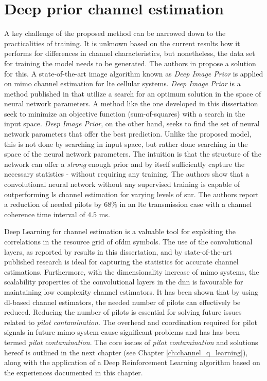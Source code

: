 \section{Deep prior channel estimation}\label{sec:research_trends_channel_estimation}
A key challenge of the proposed method can be narrowed down to the practicalities of training. It is unknown based on the current results how it performs for differences in channel characteristics, but nonetheless, the data set for training the model needs to be generated. The authors in \cite{Balevi2019} propose a solution for this. A state-of-the-art image algorithm known as \emph{Deep Image Prior} is applied on \gls{mimo} channel estimation for \gls{lte} cellular systems. \emph{Deep Image Prior} is a method published in \cite{DeepPrior} that utilize a search for an optimum solution in the space of neural network parameters. A method like the one developed in this dissertation seek to minimize an objective function (sum-of-squares) with a search in the input space. \emph{Deep Image Prior}, on the other hand, seeks to find the set of neural network parameters that offer the best prediction. Unlike the proposed model, this is not done by searching in input space, but rather done searching in the space of the neural network parameters. The intuition is that the structure of the network can offer a \emph{strong} enough prior and by itself sufficiently capture the necessary statistics  - without requiring any training. The authors show that a convolutional neural network without any supervised training is capable of outperforming \gls{ls} channel estimation for varying levels of \gls{snr}. The authors report a reduction of needed pilots by $68\%$ in an \gls{lte} transmission case with a channel coherence time interval of $4.5$ ms.

Deep Learning for channel estimation is a valuable tool for exploiting the correlations in the resource grid of \gls{ofdm} symbols. The use of the convolutional layers, as reported by results in this dissertation, and by state-of-the-art published research is ideal for capturing the statistics for accurate channel estimations. Furthermore, with the dimensionality increase of \gls{mimo} systems, the scalability properties of the convolutional layers in the \gls{dnn} is favourable for maintaining low complexity channel estimators. It has been shown that by using \gls{dl}-based channel estimators, the needed number of pilots can effectively be reduced. Reducing the number of pilots is essential for solving future issues related to \emph{pilot contamination}. The overhead and coordination required for pilot signals in future \gls{mimo} system cause significant problems and has has been termed \emph{pilot contamination}. The core issues of \emph{pilot contamination} and solutions hereof is outlined in the next chapter (see Chapter \ref{ch:channel_q_learning}), along with the application of a Deep Reinforcement Learning algorithm based on the experiences documented in this chapter.

